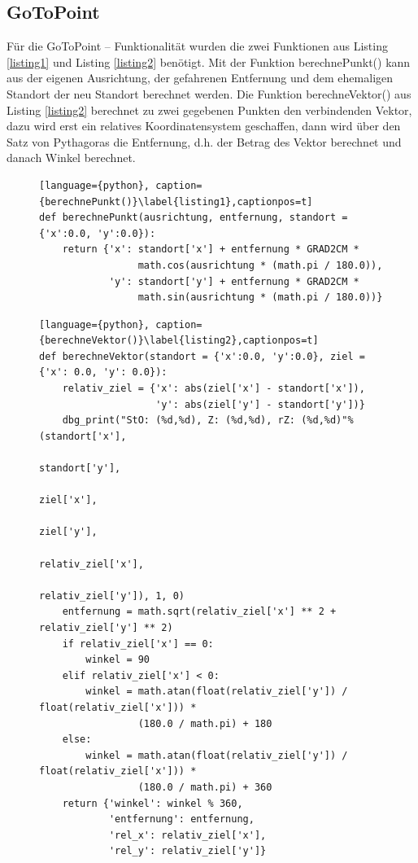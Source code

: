 \documentclass[10pt,a4paper]{scrartcl}
\begin{document}
\subsection{GoToPoint}
Für die GoToPoint -- Funktionalität wurden die zwei Funktionen aus Listing \ref{listing1} und Listing \ref{listing2} benötigt. Mit der Funktion berechnePunkt() kann aus der eigenen Ausrichtung, der gefahrenen Entfernung und dem ehemaligen Standort der neu Standort berechnet werden. Die Funktion berechneVektor() aus Listing \ref{listing2} berechnet zu zwei gegebenen Punkten den verbindenden Vektor, dazu wird erst ein relatives Koordinatensystem geschaffen, dann wird über den Satz von Pythagoras die Entfernung, d.h. der Betrag des Vektor berechnet und danach Winkel berechnet.
\begin{figure}[h]
\begin{lstlisting}[language={python}, caption={berechnePunkt()}\label{listing1},captionpos=t]
def berechnePunkt(ausrichtung, entfernung, standort = {'x':0.0, 'y':0.0}):
    return {'x': standort['x'] + entfernung * GRAD2CM * 
    			 math.cos(ausrichtung * (math.pi / 180.0)),
            'y': standort['y'] + entfernung * GRAD2CM * 
            	 math.sin(ausrichtung * (math.pi / 180.0))}
\end{lstlisting}
\end{figure}
\begin{figure}[h]
\begin{lstlisting}[language={python}, caption={berechneVektor()}\label{listing2},captionpos=t]
def berechneVektor(standort = {'x':0.0, 'y':0.0}, ziel = {'x': 0.0, 'y': 0.0}):
    relativ_ziel = {'x': abs(ziel['x'] - standort['x']), 
    				'y': abs(ziel['y'] - standort['y'])}
    dbg_print("StO: (%d,%d), Z: (%d,%d), rZ: (%d,%d)"%(standort['x'],
                                                       standort['y'],
                                                       ziel['x'], 
                                                       ziel['y'], 
                                                       relativ_ziel['x'], 
                                                       relativ_ziel['y']), 1, 0)
    entfernung = math.sqrt(relativ_ziel['x'] ** 2 + relativ_ziel['y'] ** 2)
    if relativ_ziel['x'] == 0:
        winkel = 90
    elif relativ_ziel['x'] < 0:
        winkel = math.atan(float(relativ_ziel['y']) / float(relativ_ziel['x'])) * 
        		 (180.0 / math.pi) + 180
    else:
        winkel = math.atan(float(relativ_ziel['y']) / float(relativ_ziel['x'])) * 
        		 (180.0 / math.pi) + 360
    return {'winkel': winkel % 360, 
    		'entfernung': entfernung, 
    		'rel_x': relativ_ziel['x'], 
    		'rel_y': relativ_ziel['y']}
\end{lstlisting}
\end{figure}
\end{document}
